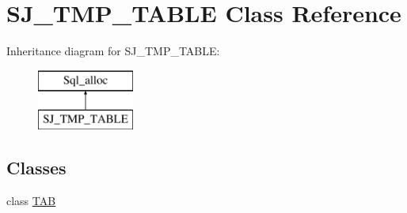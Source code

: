 \hypertarget{classSJ__TMP__TABLE}{}\section{S\+J\+\_\+\+T\+M\+P\+\_\+\+T\+A\+B\+LE Class Reference}
\label{classSJ__TMP__TABLE}
Inheritance diagram for S\+J\+\_\+\+T\+M\+P\+\_\+\+T\+A\+B\+LE\+:\begin{figure}[H]
\begin{center}
\leavevmode
\includegraphics[height=2.000000cm]{classSJ__TMP__TABLE}
\end{center}
\end{figure}
\subsection*{Classes}
\begin{DoxyCompactItemize}
\item 
class \mbox{\hyperlink{classSJ__TMP__TABLE_1_1TAB}{T\+AB}}
\end{DoxyCompactItemize}
